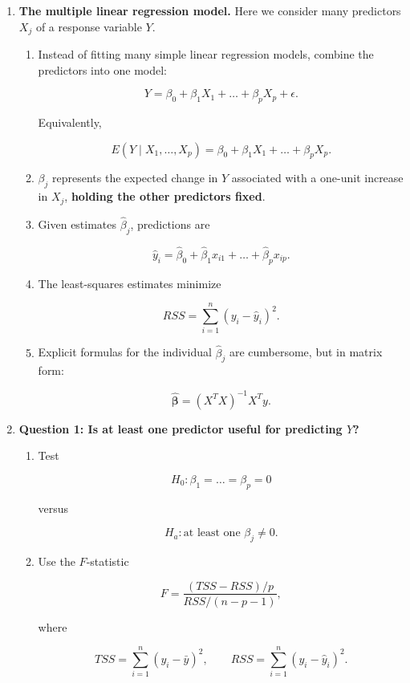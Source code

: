 \documentclass{article}
\begin{document}
\begin{enumerate}

\item \textbf{The multiple linear regression model.}
Here we consider many predictors $X_j$ of a response variable $Y$.
\begin{enumerate}
\item Instead of fitting many simple linear regression models, combine the predictors into one model:

$$
Y=\beta_0+\beta_1X_1+\dots+\beta_pX_p+\epsilon.
$$

Equivalently,

$$
E(Y\mid X_1,\dots,X_p)
=
\beta_0+\beta_1X_1+\dots+\beta_pX_p.
$$

\item $\beta_j$ represents the expected change in $Y$ associated with a one-unit increase in $X_j$, \textbf{holding the other predictors fixed}.

\item Given estimates $\hat{\beta}_j$, predictions are

$$
\hat{y}_i=
\hat{\beta}_0+\hat{\beta}_1x_{i1}+\dots+\hat{\beta}_px_{ip}.
$$

\item The least-squares estimates minimize

$$
RSS=\sum_{i=1}^n(y_i-\hat{y}_i)^2.
$$

\item Explicit formulas for the individual $\hat{\beta}_j$ are cumbersome, but in matrix form:

$$
\hat{\boldsymbol{\beta}}
=
(X^TX)^{-1}X^Ty.
$$

\end{enumerate}

\item \textbf{Question 1: Is at least one predictor useful for predicting $Y$?}
\begin{enumerate}
\item Test

$$
H_0:\beta_1=\dots=\beta_p=0
$$

versus

$$
H_a:\text{at least one }\beta_j\neq0.
$$

\item Use the $F$-statistic

$$
F=
\frac{(TSS-RSS)/p}{RSS/(n-p-1)},
$$

where

$$
TSS=\sum_{i=1}^n(y_i-\bar y)^2,
\qquad
RSS=\sum_{i=1}^n(y_i-\hat y_i)^2.
$$


\end{enumerate}
\end{enumerate}
\end{document}
